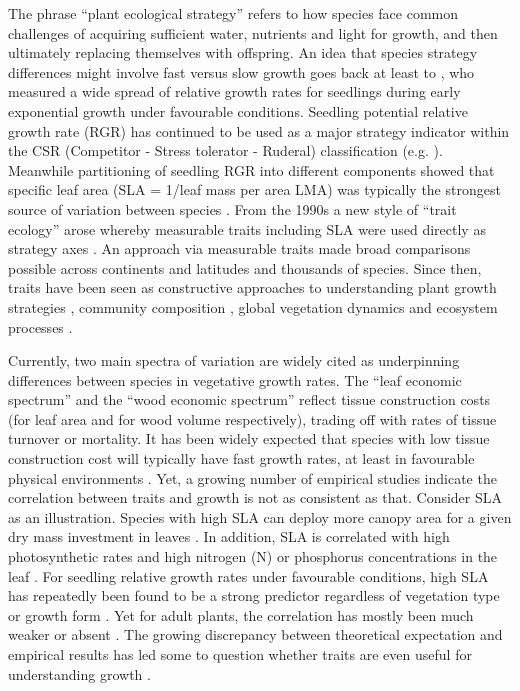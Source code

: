 \documentclass[a4paper,11pt]{article}
\begin{document}
The phrase ``plant ecological strategy'' refers to how species face common challenges of acquiring sufficient water, nutrients and light for growth, and then ultimately replacing themselves with offspring. An idea that species strategy differences might involve fast versus slow growth goes back at least to \citet{Grime:1975gr}, who measured a wide spread of relative growth rates for seedlings during early exponential growth under favourable conditions. Seedling potential relative growth rate (RGR) has continued to be used as a major strategy indicator within the CSR (Competitor - Stress tolerator - Ruderal) classification (e.g. \citealt{grime1979plant, Grime:1997wm}). Meanwhile partitioning of seedling RGR into different components showed that specific leaf area (SLA = 1/leaf mass per area LMA) was typically the strongest source of variation between species \citep{Poorter:1989tx}. From the 1990s a new style of ``trait ecology'' arose whereby measurable traits including SLA were used directly as strategy axes \citep{Westoby:2002ft}. An approach via measurable traits made broad comparisons possible across continents and latitudes and thousands of species. Since then, traits have been seen as constructive approaches to understanding plant growth strategies \citep{Grime:1977kc,Chapin:1980gz}, community composition \citep{Lavorel:2002ff,Shipley:2006ie}, global vegetation dynamics \citep{Scheiter:2013ed} and ecosystem processes \citep{Lavorel:2002ff}.

Currently, two main spectra of variation are widely cited as underpinning differences between species in vegetative growth rates. The ``leaf economic spectrum'' \citep{Wright:2004jb} and the ``wood economic spectrum'' \citep{Chave:2009iy} reflect tissue construction costs (for leaf area and for wood volume respectively), trading off with rates of tissue turnover or mortality. It has been widely expected that species with low tissue construction cost will typically have fast growth rates, at least in favourable physical environments \citep[e.g.][]{MullerLandau:2004dc,Poorter:2008iu,Chave:2009iy,Larjavaara:2010bn,Iida:2012jb,Paine:2015df}. Yet, a growing number of empirical studies indicate the correlation between traits and growth is not as consistent as that. Consider SLA as an illustration. Species with high SLA can deploy more canopy area for a given dry mass investment in leaves \citep{Poorter:1999wd, Reich:1992wm}. In addition, SLA is correlated with high photosynthetic rates and high nitrogen (N) or phosphorus concentrations in the leaf \citep{Wright:2004jb}. For seedling relative growth rates under favourable conditions, high SLA has repeatedly been found to be a strong predictor regardless of vegetation type or growth form \citep{Lambers:1992bj,Reich:1992wm,Grime:1997wm,Poorter:1999wd,Wright:1999ds}. Yet for adult plants, the correlation has mostly been much weaker or absent \citep{coomes_comparison_1998,Poorter:2008iu,Aiba:2009ft,Easdale:2009gv,Wright:2010tp}. The growing discrepancy between theoretical expectation and empirical results has led some to question whether traits are even useful for understanding growth \citep{Wright:2010tp, Paine:2015df}.
\end{document}
